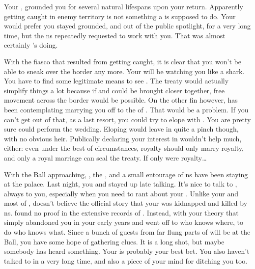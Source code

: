 \documentclass[char]{NeptuneBall}
\begin{document}
Your \cKing{\parent}, \cKing{\King} \cKing{} grounded you for several natural lifespans upon your return. Apparently getting caught in enemy territory is not something a \cPrincess{\prince} is supposed to do. Your \cKing{\parent} would prefer you stayed grounded, and out of the public spotlight, for a very long time, but the \pPacifica{}ns repeatedly requested to work with you. That was almost certainly \cDiplomat{}'s doing. 

With the fiasco that resulted from getting caught, it is clear that you won't be able to sneak over the border any more. Your \cKing{\parent} will be watching you like a shark. You have to find some legitimate means to see \cDiplomat{}. The treaty would actually simplify things a lot because if \pPacifica{} and \pAtlantis{} could be brought closer together, free movement across the border would be possible. On the other fin however, \cKing{\King} \cKing{} has been contemplating marrying you off to the \cPrince{\prince} of \pPacifica{}. That would be a problem.  If you can't get out of that, as a last resort, you could try to elope with \cDiplomat{}. You are pretty sure \cPriest{} could perform the wedding. Eloping would leave \pAtlantis{} in quite a pinch though, with no obvious heir. Publically declaring your interest in \cDiplomat{} wouldn't help much, either: even under the best of circumstances, royalty should only marry royalty, and only a royal marriage can seal the treaty. If only \cDiplomat{} were royalty\ldots

With the \cExExKing{} Ball approaching, \cDiplomat{}, the \cPrince{\prince}, and a small entourage of \pPacifica{}ns have been staying at the palace. Last night, you and \cDiplomat{} stayed up late talking. It's nice to talk to \cDiplomat{\them}, \cDiplomat{\they} always  to you, especially when you need to rant about your \cQueen{\parent}. Unlike your \cKing{\parent} and most of \pAtlantis{}, \cDiplomat{} doesn't believe the official story that your \cQueen{\parent} was kidnapped and killed by \pPacifica{}ns. \cDiplomat{\They} \cDiplomat{\have} found no proof in the extensive records of \pPacifica{}. Instead, \cDiplomat{\they}  with your theory that \cQueen{\King} \cQueen{} simply abandoned you in your early years and went off to who knows where, to do who knows what.  Since a bunch of guests from far flung parts of \pAtlantis{} will be at the Ball, you have some hope of gathering clues. It is a long shot, but maybe somebody has heard something. Your \cAriel{\sibling} \cAriel{} is probably your best bet. You also haven't talked to \cAriel{} in a very long time, and \cAriel{\they} also  a piece of your mind for ditching you too.
\end{document}
